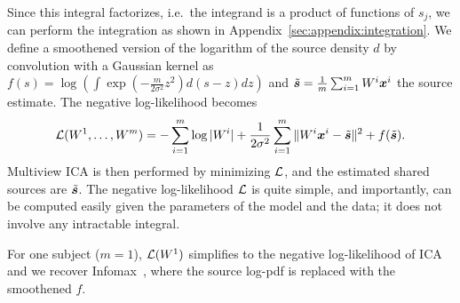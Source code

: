 %
Since this integral factorizes, i.e.\ the integrand is a product of functions of $s_j$, we can perform the integration as shown in Appendix~\ref{sec:appendix:integration}. We define a smoothened version of the logarithm of the source density $d$ by convolution with a Gaussian kernel as
$
    f(s)= \log \left(\int \exp(-\frac{m}{2\sigma^2} z^2) d(s-z) dz\right)
$
and $\tilde{\boldsymbol{s}} = \frac1m\sum_{i=1}^m W^i\boldsymbol{x}^i$ the source estimate.
The negative log-likelihood becomes
\begin{equation}
    \label{eq:cost_function}
    \mathcal{L}(W^1, \dots, W^m) = -\sum_{i=1}^m \log|W^i| + \frac1{2\sigma^2}\sum_{i=1}^m\|W^i\boldsymbol{x}^i - \tilde{\boldsymbol{s}}\|^2 + f(\tilde{\boldsymbol{s}}).
\end{equation}
Multiview ICA is then performed by minimizing $\mathcal{L}$, and the estimated shared sources are $\tilde{\boldsymbol{s}}$.
The negative log-likelihood $\mathcal{L}$ is quite simple, and importantly, can be computed easily given the parameters of the model and the data; it does not involve any intractable integral.
%

For one subject ($m=1$), $\mathcal{L}(W^1)$ simplifies to the negative log-likelihood of ICA and we recover Infomax~\cite{bell1995information,cardoso1997infomax}, where the source log-pdf is replaced with the smoothened $f$.
%
